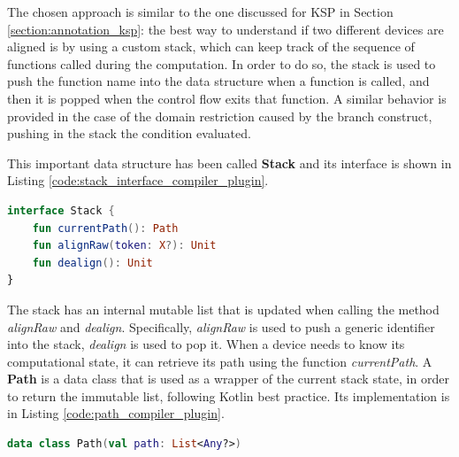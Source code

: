 The chosen approach is similar to the one discussed for KSP in Section \ref{section:annotation_ksp}: the best way to understand if two different devices are aligned is by using a custom stack, which can keep track of the sequence of functions called during the computation. In order to do so, the stack is used to push the function name into the data structure when a function is called, and then it is popped when the control flow exits that function. A similar behavior is provided in the case of the domain restriction caused by the branch construct, pushing in the stack the condition evaluated.

This important data structure has been called \textbf{Stack} and its interface is shown in Listing \ref{code:stack_interface_compiler_plugin}.
\begin{lstlisting}[caption={Stack interface for Kotlin compiler plugin solution}, captionpos=b, language=Kotlin, label={code:stack_interface_compiler_plugin}]
interface Stack {
    fun currentPath(): Path
    fun alignRaw(token: X?): Unit
    fun dealign(): Unit
}
\end{lstlisting}
The stack has an internal mutable list that is updated when calling the method \textit{alignRaw} and \textit{dealign}. Specifically, \textit{alignRaw} is used to push a generic identifier into the stack, \textit{dealign} is used to pop it.\newline
When a device needs to know its computational state, it can retrieve its path using the function \textit{currentPath}. A \textbf{Path} is a data class that is used as a wrapper of the current stack state, in order to return the immutable list, following Kotlin best practice. Its implementation is in Listing \ref{code:path_compiler_plugin}.
\begin{lstlisting}[caption={Path dataclass for Kotlin compiler plugin solution}, captionpos=b, language=Kotlin, label={code:path_compiler_plugin}]
data class Path(val path: List<Any?>)
\end{lstlisting}

